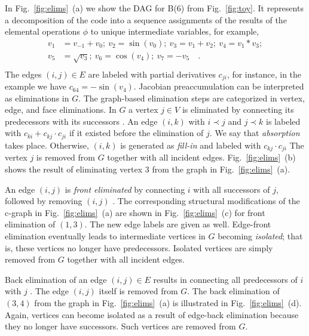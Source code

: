 \documentclass[11pt]{article}
\newcommand{\reffig}[1]{{Fig.~\ref{#1}}}
\begin{document}
In \reffig{fig:elims}~(a) we show the DAG for B(6) from \reffig{fig:toy}. 
It represents a decomposition of the code into a sequence assignments of
the results of the elemental operations $\phi$ to unique intermediate 
variables,
for example,
\begin{equation}\label{eqn:sampleCode}
\begin{split}
 v_1&=v_{-1}+v_0;~v_2=\sin(v_0);~v_3=v_1+v_2;~v_4=v_1*v_3; \\
v_5&=\sqrt{v_3};~v_6=\cos(v_4);~v_7=-v_5 \quad .\\
\end{split}
\end{equation}
The edges $(i,j)\in E$ are labeled with partial derivatives
$c_{ji}$, for instance, in the 
example we have $c_{64}=-\sin(v_4)$.
Jacobian preaccumulation can be interpreted as eliminations in $G$.
The graph-based elimination steps are categorized in vertex, edge, and face 
eliminations. 
In $G$ a vertex $j \in V$ is eliminated by connecting its predecessors with
its successors \cite{GrRe91}.
An edge $(i,k)$ with
$i \prec j$ and $j \prec k$ is labeled with
$c_{ki}+c_{kj} \cdot c_{ji}$ if it existed before the elimination of $j.$
We say that {\em absorption} takes place.
Otherwise, $(i,k)$ is generated as {\em fill-in} and labeled
with $c_{kj} \cdot c_{ji}$
The vertex $j$ is removed from
$G$ together with all incident edges. 
\reffig{fig:elims}~(b) shows the result of eliminating vertex $3$
from the graph in \reffig{fig:elims}~(a).

An edge $(i,j)$ is {\em front eliminated} by connecting $i$ with all successors
of $j$, followed by removing $(i,j)$ \cite{Nau00a}.
The corresponding structural modifications of the c-graph in
\reffig{fig:elims}~(a) are shown in
\reffig{fig:elims}~(c) for front elimination of $(1,3).$
The new edge labels are given as well.
Edge-front elimination eventually leads to intermediate vertices in $G$
becoming
{\em isolated}; that is, these vertices no longer have predecessors.
Isolated vertices are simply removed from $G$ together
with all incident edges.

Back elimination of an edge
$(i,j) \in E$ results in connecting all predecessors of $i$
with $j$ \cite{Nau00a}.
The edge $(i,j)$ itself is removed from $G.$
The back elimination of $(3,4)$ from the graph in \reffig{fig:elims}~(a) 
is illustrated in \reffig{fig:elims}~(d). 
Again, vertices can become isolated as a result of edge-back elimination
because they no longer have successors.
Such vertices are removed from $G.$
\end{document}
